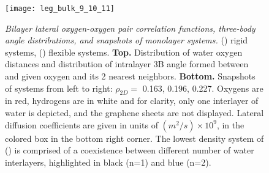 \documentclass[journal=acsnano,manuscript=article]{achemso}
\begin{document}
\begin{figure}[ht!]
	\centering
	\texttt{[image: leg\_bulk\_9\_10\_11]}\\
	\caption{\textit{Bilayer lateral oxygen-oxygen pair correlation functions, three-body angle distributions, and snapshots of monolayer systems.} (\protect{}) rigid systems, (\protect{}) flexible systems. \textbf{Top.} Distribution of water oxygen distances and distribution of intralayer 3B angle formed between and given oxygen and its 2 nearest neighbors. \textbf{Bottom.} Snapshots of systems from left to right: \(\rho_{2D}=\) 0.163, 0.196, 0.227. Oxygens are in red, hydrogens are in white and for clarity, only one interlayer of water is depicted, and the graphene sheets are not displayed. Lateral diffusion coefficients are given in units of \((m^2/s) \times 10^9\), in the colored box in the bottom right corner. The lowest density system of (\protect{}) is comprised of a coexistence between different number of water interlayers, highlighted in black (n=1) and blue (n=2).}
	\label{fig:struct_9_10_11}
\end{figure}
\end{document}
